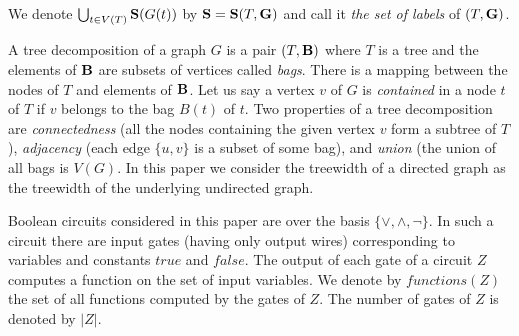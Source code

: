 \documentclass{llncs}
\begin{document}
We denote $\bigcup_{t \in V(T)}{\bf S}(G(t))$ by ${\bf S}={\bf S}(T,{\bf G})$ and call it \emph{the set of labels} of $(T,{\bf G})$.


 


A tree decomposition of a graph $G$ is a pair $(T,{\bf B})$ where $T$ is a tree and the elements of ${\bf B}$ are subsets of vertices
called \emph{bags}. There is a mapping between the nodes of $T$ and elements of ${\bf B}$. 
Let us say a vertex $v$ of $G$ is \emph{contained} in a node $t$ of $T$ if $v$ belongs to the bag $B(t)$ of $t$.
Two properties of a tree decomposition are \emph{connectedness} (all the nodes containing the given vertex
$v$ form a subtree of $T$), \emph{adjacency} (each edge $\{u,v\}$ is a subset of some bag), and \emph{union} (the union
of all bags is  $V(G)$. In this paper we consider the treewidth of a directed graph as the treewidth of the underlying undirected graph.

Boolean circuits considered in this paper are over the basis $\{\vee,\wedge,\neg\}$.
In such a circuit there are input gates (having only output wires) corresponding to variables and constants
$true$ and $false$. The output of each gate of a circuit $Z$ computes a function on the set of input variables.
We denote by $functions(Z)$ the set of all functions computed by the gates of $Z$.
The number of gates of $Z$ is denoted by $|Z|$.
\end{document}
